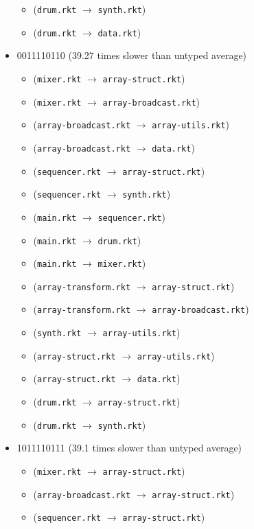 \documentclass{article}
\newcommand{\mono}[1]{\texttt{#1}}
\begin{document}
\begin{itemize}
\begin{itemize}
  \item (\mono{drum.rkt} $\rightarrow$ \mono{synth.rkt})
  \item (\mono{drum.rkt} $\rightarrow$ \mono{data.rkt})
  \end{itemize}
\item 0011110110 (39.27 times slower than untyped average)
  \begin{itemize}
  \item (\mono{mixer.rkt} $\rightarrow$ \mono{array-struct.rkt})
  \item (\mono{mixer.rkt} $\rightarrow$ \mono{array-broadcast.rkt})
  \item (\mono{array-broadcast.rkt} $\rightarrow$ \mono{array-utils.rkt})
  \item (\mono{array-broadcast.rkt} $\rightarrow$ \mono{data.rkt})
  \item (\mono{sequencer.rkt} $\rightarrow$ \mono{array-struct.rkt})
  \item (\mono{sequencer.rkt} $\rightarrow$ \mono{synth.rkt})
  \item (\mono{main.rkt} $\rightarrow$ \mono{sequencer.rkt})
  \item (\mono{main.rkt} $\rightarrow$ \mono{drum.rkt})
  \item (\mono{main.rkt} $\rightarrow$ \mono{mixer.rkt})
  \item (\mono{array-transform.rkt} $\rightarrow$ \mono{array-struct.rkt})
  \item (\mono{array-transform.rkt} $\rightarrow$ \mono{array-broadcast.rkt})
  \item (\mono{synth.rkt} $\rightarrow$ \mono{array-utils.rkt})
  \item (\mono{array-struct.rkt} $\rightarrow$ \mono{array-utils.rkt})
  \item (\mono{array-struct.rkt} $\rightarrow$ \mono{data.rkt})
  \item (\mono{drum.rkt} $\rightarrow$ \mono{array-struct.rkt})
  \item (\mono{drum.rkt} $\rightarrow$ \mono{synth.rkt})
  \end{itemize}
\item 1011110111 (39.1 times slower than untyped average)
  \begin{itemize}
  \item (\mono{mixer.rkt} $\rightarrow$ \mono{array-struct.rkt})
  \item (\mono{array-broadcast.rkt} $\rightarrow$ \mono{array-struct.rkt})
  \item (\mono{sequencer.rkt} $\rightarrow$ \mono{array-struct.rkt})

\end{itemize}
\end{itemize}
\end{document}
